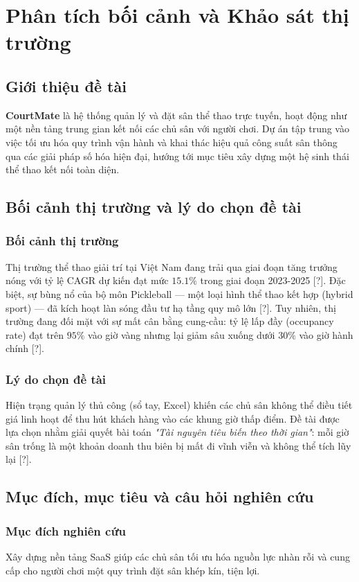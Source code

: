\section{Phân tích bối cảnh và Khảo sát thị trường}

\subsection{Giới thiệu đề tài}
\textbf{CourtMate} là hệ thống quản lý và đặt sân thể thao trực tuyến, hoạt động như một nền tảng trung gian kết nối các chủ sân với người chơi. Dự án tập trung vào việc tối ưu hóa quy trình vận hành và khai thác hiệu quả công suất sân thông qua các giải pháp số hóa hiện đại, hướng tới mục tiêu xây dựng một hệ sinh thái thể thao kết nối toàn diện.

\subsection{Bối cảnh thị trường và lý do chọn đề tài}
\subsubsection{Bối cảnh thị trường}
Thị trường thể thao giải trí tại Việt Nam đang trải qua giai đoạn tăng trưởng nóng với tỷ lệ CAGR dự kiến đạt mức $15.1\%$ trong giai đoạn 2023-2025 [?]. Đặc biệt, sự bùng nổ của bộ môn Pickleball — một loại hình thể thao kết hợp (hybrid sport) — đã kích hoạt làn sóng đầu tư hạ tầng quy mô lớn [?]. Tuy nhiên, thị trường đang đối mặt với sự mất cân bằng cung-cầu: tỷ lệ lấp đầy (occupancy rate) đạt trên $95\%$ vào giờ vàng nhưng lại giảm sâu xuống dưới $30\%$ vào giờ hành chính [?].

\subsubsection{Lý do chọn đề tài}
Hiện trạng quản lý thủ công (sổ tay, Excel) khiến các chủ sân không thể điều tiết giá linh hoạt để thu hút khách hàng vào các khung giờ thấp điểm. Đề tài được lựa chọn nhằm giải quyết bài toán \textit{"Tài nguyên tiêu biến theo thời gian"}: mỗi giờ sân trống là một khoản doanh thu biên bị mất đi vĩnh viễn và không thể tích lũy lại [?].

\subsection{Mục đích, mục tiêu và câu hỏi nghiên cứu}
\subsubsection{Mục đích nghiên cứu}
Xây dựng nền tảng SaaS giúp các chủ sân tối ưu hóa nguồn lực nhàn rỗi và cung cấp cho người chơi một quy trình đặt sân khép kín, tiện lợi.

